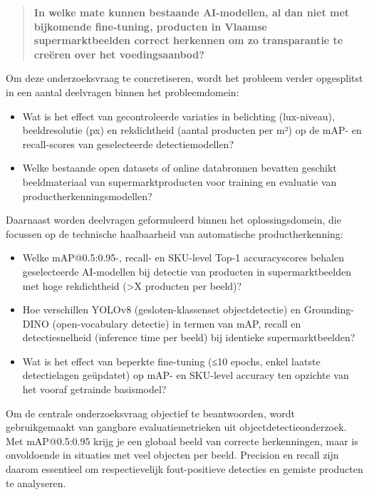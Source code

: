 \begin{quote}
\textbf{In welke mate kunnen bestaande AI-modellen, al dan niet met bijkomende fine-tuning, producten in Vlaamse supermarktbeelden correct herkennen om zo transparantie te creëren over het voedingsaanbod?}
\end{quote}

Om deze onderzoeksvraag te concretiseren, wordt het probleem verder opgesplitst in een aantal deelvragen binnen het probleemdomein:
\begin{itemize}
    \item Wat is het effect van gecontroleerde variaties in belichting (lux-niveau), beeldresolutie (px) en rekdichtheid (aantal producten per m²) op de mAP- en recall-scores van geselecteerde detectiemodellen?
    \item Welke bestaande open datasets of online databronnen bevatten geschikt beeldmateriaal van supermarktproducten voor training en evaluatie van productherkenningsmodellen?
\end{itemize}

Daarnaast worden deelvragen geformuleerd binnen het oplossingsdomein, die focussen op de technische haalbaarheid van automatische productherkenning:
\begin{itemize}
    \item Welke mAP@0.5:0.95-, recall- en SKU-level Top-1 accuracyscores behalen geselecteerde AI-modellen bij detectie van producten in supermarktbeelden met hoge rekdichtheid (>X producten per beeld)?
    \item Hoe verschillen YOLOv8 (gesloten-klassenset objectdetectie) en Grounding-DINO (open-vocabulary detectie) in termen van mAP, recall en detectiesnelheid (inference time per beeld) bij identieke supermarktbeelden?
    \item Wat is het effect van beperkte fine-tuning (≤10 epochs, enkel laatste detectielagen geüpdatet) op mAP- en SKU-level accuracy ten opzichte van het vooraf getrainde basismodel?
\end{itemize}

Om de centrale onderzoeksvraag objectief te beantwoorden, wordt gebruikgemaakt van gangbare evaluatiemetrieken uit objectdetectieonderzoek. Met mAP@0.5:0.95 krijg je een globaal beeld van correcte herkenningen, maar is onvoldoende in situaties met veel objecten per beeld. Precision en recall zijn daarom essentieel om respectievelijk fout-positieve detecties en gemiste producten te analyseren. 


